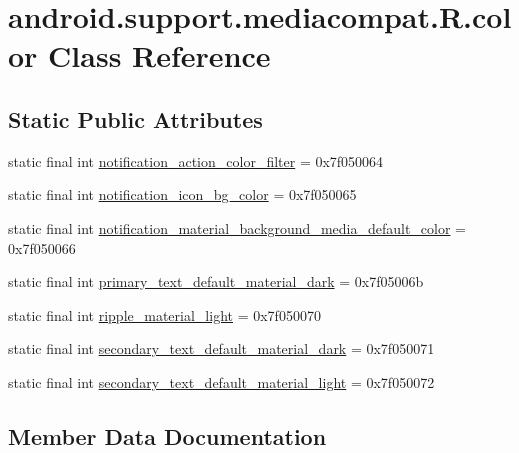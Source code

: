 \hypertarget{classandroid_1_1support_1_1mediacompat_1_1R_1_1color}{}\section{android.\+support.\+mediacompat.\+R.\+color Class Reference}
\label{classandroid_1_1support_1_1mediacompat_1_1R_1_1color}
\subsection*{Static Public Attributes}
\begin{DoxyCompactItemize}
\item 
static final int \mbox{\hyperlink{classandroid_1_1support_1_1mediacompat_1_1R_1_1color_af7b049d06f32f58f426d2c3ca224e105}{notification\+\_\+action\+\_\+color\+\_\+filter}} = 0x7f050064
\item 
static final int \mbox{\hyperlink{classandroid_1_1support_1_1mediacompat_1_1R_1_1color_a042897e29a450c630006ddda1c0c106c}{notification\+\_\+icon\+\_\+bg\+\_\+color}} = 0x7f050065
\item 
static final int \mbox{\hyperlink{classandroid_1_1support_1_1mediacompat_1_1R_1_1color_a672cf80ae7812b859bcb839cc1b6f10e}{notification\+\_\+material\+\_\+background\+\_\+media\+\_\+default\+\_\+color}} = 0x7f050066
\item 
static final int \mbox{\hyperlink{classandroid_1_1support_1_1mediacompat_1_1R_1_1color_a5474a7700d6c581c0abbfb09bf42e5eb}{primary\+\_\+text\+\_\+default\+\_\+material\+\_\+dark}} = 0x7f05006b
\item 
static final int \mbox{\hyperlink{classandroid_1_1support_1_1mediacompat_1_1R_1_1color_a6cf894c1ec0271594327d322d9bf00bd}{ripple\+\_\+material\+\_\+light}} = 0x7f050070
\item 
static final int \mbox{\hyperlink{classandroid_1_1support_1_1mediacompat_1_1R_1_1color_a39c9f3c00795c0b48c578aa9504b0c82}{secondary\+\_\+text\+\_\+default\+\_\+material\+\_\+dark}} = 0x7f050071
\item 
static final int \mbox{\hyperlink{classandroid_1_1support_1_1mediacompat_1_1R_1_1color_a300f378d96501458fb9fd01e2f4ea7aa}{secondary\+\_\+text\+\_\+default\+\_\+material\+\_\+light}} = 0x7f050072
\end{DoxyCompactItemize}


\subsection{Member Data Documentation}
\mbox{\label{classandroid_1_1support_1_1mediacompat_1_1R_1_1color_af7b049d06f32f58f426d2c3ca224e105}} 
